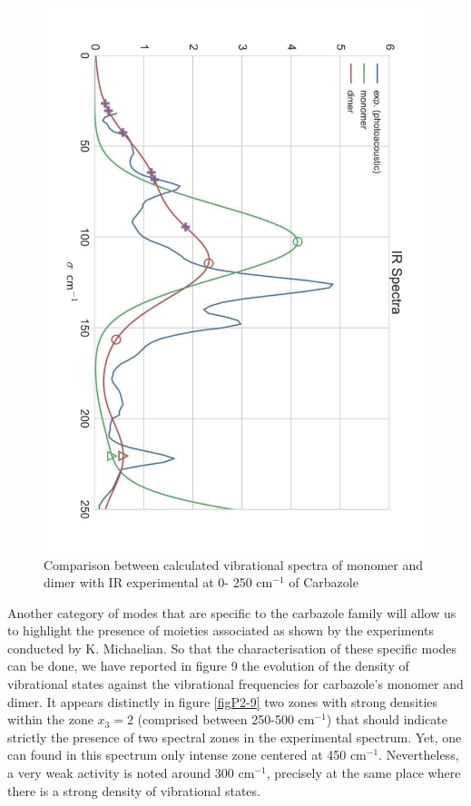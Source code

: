 	 		\begin{figure}[H]
	 			\begin{center}
	 				\includegraphics[angle=90,scale=0.32]{image/8}
	 			\end{center}
	 			\caption{Comparison between calculated vibrational spectra of monomer and dimer with IR experimental at 0- 250 cm$^{-1}$ of Carbazole} \label{figP2-8}
	 		\end{figure}
	 		
	 		
	
	Another category of modes that are specific to the carbazole family will allow us to highlight the presence of moieties associated as shown by the experiments conducted by K. Michaelian. So that the characterisation of these specific modes can be done, we have reported in figure 9 the evolution of the density of vibrational states against the vibrational frequencies for carbazole’s monomer and dimer. It appears distinctly in figure \ref{figP2-9} two zones with strong densities within the zone $x_3=2$ (comprised between 250-500 cm$^{-1}$) that should indicate strictly the presence of two spectral zones in the experimental spectrum. Yet, one can found in this spectrum only intense zone centered at 450 cm$^{-1}$. Nevertheless, a very weak activity is noted around 300 cm$^{-1}$, precisely at the same place where there is a strong density of vibrational states. 
	
